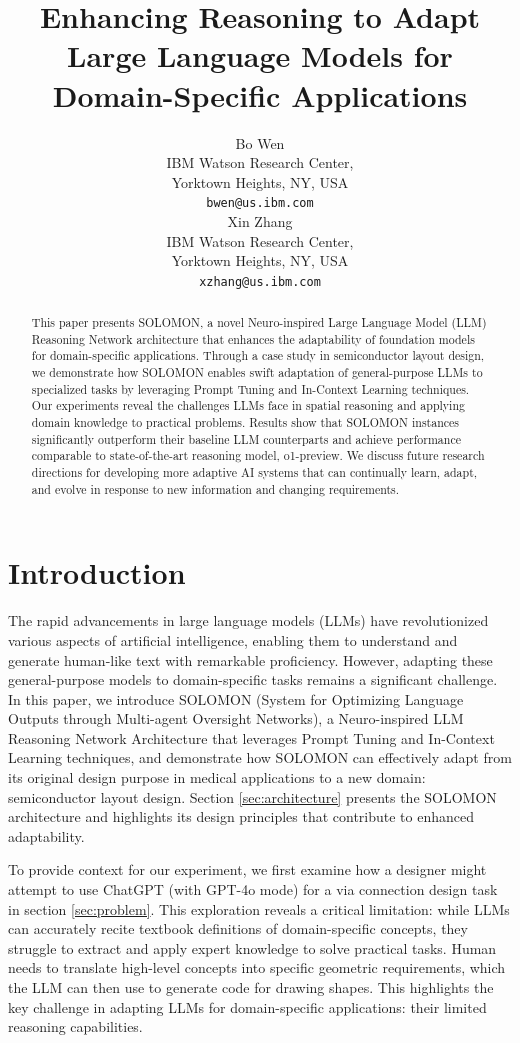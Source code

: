 \documentclass{article}
\title{Enhancing Reasoning to Adapt Large Language Models for Domain-Specific Applications}
\author{%
  Bo Wen\\
  IBM Watson Research Center, \\
  Yorktown Heights, NY, USA \\
  \texttt{bwen@us.ibm.com} \\
  \And
  Xin Zhang\\
  IBM Watson Research Center, \\
  Yorktown Heights, NY, USA \\
  \texttt{xzhang@us.ibm.com} \\
}
\begin{document}
\maketitle

\begin{abstract}
This paper presents SOLOMON, a novel Neuro-inspired Large Language Model (LLM) Reasoning Network architecture that enhances the adaptability of foundation models for domain-specific applications. Through a case study in semiconductor layout design, we demonstrate how SOLOMON enables swift adaptation of general-purpose LLMs to specialized tasks by leveraging Prompt Tuning and In-Context Learning techniques. Our experiments reveal the challenges LLMs face in spatial reasoning and applying domain knowledge to practical problems. Results show that SOLOMON instances significantly outperform their baseline LLM counterparts and achieve performance comparable to state-of-the-art reasoning model, o1-preview. We discuss future research directions for developing more adaptive AI systems that can continually learn, adapt, and evolve in response to new information and changing requirements.
\end{abstract}

\section{Introduction}
The rapid advancements in large language models (LLMs) have revolutionized various aspects of artificial intelligence, enabling them to understand and generate human-like text with remarkable proficiency. However, adapting these general-purpose models to domain-specific tasks remains a significant challenge. In this paper, we introduce SOLOMON (System for Optimizing Language Outputs through Multi-agent Oversight Networks), a Neuro-inspired LLM Reasoning Network Architecture that leverages Prompt Tuning and In-Context Learning techniques, and demonstrate how SOLOMON can effectively adapt from its original design purpose in medical applications to a new domain: semiconductor layout design. Section \ref{sec:architecture} presents the SOLOMON architecture and highlights its design principles that contribute to enhanced adaptability.

To provide context for our experiment, we first examine how a designer might attempt to use ChatGPT (with GPT-4o mode) for a via connection design task in section \ref{sec:problem}. This exploration reveals a critical limitation: while LLMs can accurately recite textbook definitions of domain-specific concepts, they struggle to extract and apply expert knowledge to solve practical tasks. Human needs to translate high-level concepts into specific geometric requirements, which the LLM can then use to generate code for drawing shapes. This highlights the key challenge in adapting LLMs for domain-specific applications: their limited reasoning capabilities.
\end{document}
